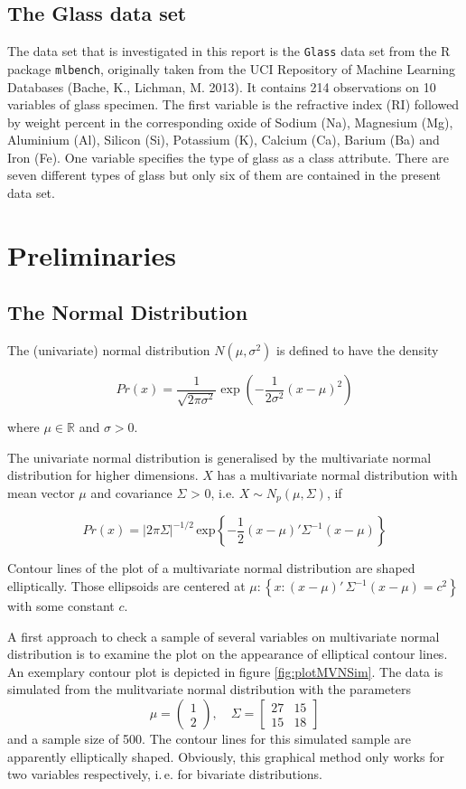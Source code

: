 \documentclass[a4paper, 12pt, titlepage, headsepline, listof = totoc, bibliography = totoc, numbers = noenddot]{scrartcl}
\newcommand{\ie}{i.\,e. }
\begin{document}
\subsection{The Glass data set}

The data set that is investigated in this report is the \texttt{Glass} data set from the R package \texttt{mlbench}, originally taken from the UCI Repository of Machine Learning Databases (Bache, K., Lichman, M. 2013). It contains 214 observations on 10 variables of glass specimen. The first variable is the refractive index (RI) followed by weight percent in the corresponding oxide of Sodium (Na), Magnesium (Mg), Aluminium (Al), Silicon (Si), Potassium (K), Calcium (Ca), Barium (Ba) and Iron (Fe). One variable specifies the type of glass as a class attribute. There are seven different types of glass but only six of them are contained in the present data set.

\newpage
\section{Preliminaries}\label{sec:preliminaries}

\subsection{The Normal Distribution}

The (univariate) normal distribution $N(\mu,\sigma^2)$ is defined to have the density

\[ Pr(x) = \frac{1}{\sqrt{2\pi\sigma^2}} \exp (-\frac{1}{2\sigma^2}(x - \mu)^2) \]

where $\mu \in \mathbb{R}$ and $\sigma > 0$.

The univariate normal distribution is generalised by the multivariate normal distribution for higher
dimensions. $X$ has a multivariate normal distribution with mean vector $\mu$ and covariance $\Sigma$ > 0, i.e. $X \sim N_p(\mu,\Sigma)$, if

\[Pr(x) = |2\pi\Sigma|^{-1/2} \,\mbox{exp}\left\{-\frac{1}{2}(x-\mu)' \Sigma^{-1}(x-\mu)\right\}\]

Contour lines of the plot of a multivariate normal distribution are shaped elliptically. Those ellipsoids are centered at $\mu : \left\{x:(x-\mu)'\, \Sigma^{-1}(x-\mu) = c^2\right\}$ with some constant $c$.

A first approach to check a sample of several variables on multivariate normal distribution is to examine the plot on the appearance of elliptical contour lines. An exemplary contour plot is depicted in figure \ref{fig:plotMVNSim}. The data is simulated from the mulitvariate normal distribution with the parameters
\[\mu = \left(\begin{array}{c} 1\\ 2\end{array} \right), \quad \Sigma = \left[\begin{array}{cc} 27 & 15\\ 15 & 18\end{array} \right]\]
and a sample size of 500. The contour lines for this simulated sample are apparently elliptically shaped. Obviously, this graphical method only works for two variables respectively, \ie for bivariate distributions.
\end{document}
